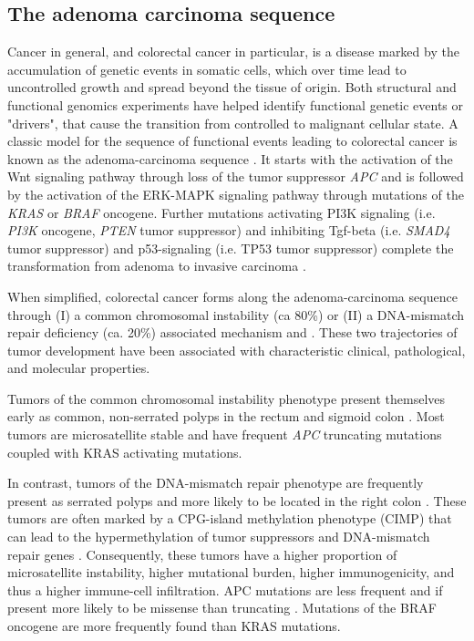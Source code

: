 \begin{flushleft}
\subsection{The adenoma carcinoma sequence}
Cancer in general, and colorectal cancer in particular, is a disease marked by the accumulation of genetic events in somatic cells, which over time lead to uncontrolled growth and spread beyond the tissue of origin. Both structural and functional genomics experiments have helped identify functional genetic events or "drivers", that cause the transition from controlled to malignant cellular state. A classic model for the sequence of functional events leading to colorectal cancer is known as the adenoma-carcinoma sequence \citep{vogelsteinGeneticAlterationsColorectaltumor1988}. It starts with the activation of the Wnt signaling pathway through loss of the tumor suppressor \textit{APC} and is followed by the activation of the ERK-MAPK signaling pathway through mutations of the \textit{KRAS} or \textit{BRAF} oncogene. Further mutations activating PI3K signaling (i.e. \textit{PI3K} oncogene, \textit{PTEN} tumor suppressor) and inhibiting Tgf-beta (i.e. \textit{SMAD4} tumor suppressor) and p53-signaling (i.e. TP53 tumor suppressor) complete the transformation from adenoma to invasive carcinoma \citep{fearonMolecularGeneticsColorectal2011}. \par

When simplified, colorectal cancer forms along the adenoma-carcinoma sequence through (I) a common chromosomal instability (ca 80\%) or (II) a DNA-mismatch repair deficiency (ca. 20\%) associated mechanism \citep{markowitzMolecularOriginsCancer2009} and \citep{pancioneGeneticEpigeneticEvents2012}. These two trajectories of tumor development have been associated with characteristic clinical, pathological, and molecular properties. 
\par

Tumors of the common chromosomal instability phenotype present themselves early as common, non-serrated polyps in the rectum and sigmoid colon \citep{markowitzMolecularOriginsCancer2009}. Most tumors are microsatellite stable and have frequent \textit{APC} truncating mutations coupled with KRAS activating mutations. 
\par 

In contrast, tumors of the DNA-mismatch repair phenotype are frequently present as serrated polyps and more likely to be located in the right colon \citep{markowitzMolecularOriginsCancer2009}. These tumors are often marked by a CPG-island methylation phenotype (CIMP) that can lead to the hypermethylation of tumor suppressors and DNA-mismatch repair genes \citep{oginoCpGIslandMethylator2009}. Consequently, these tumors have a higher proportion of microsatellite instability, higher mutational burden, higher immunogenicity, and thus a higher immune-cell infiltration. APC mutations are less frequent and if present more likely to be missense than truncating \citep{borowskyRoleAPCWNT2018}. Mutations of the BRAF oncogene are more frequently found than KRAS mutations. 
\par


\end{flushleft}
